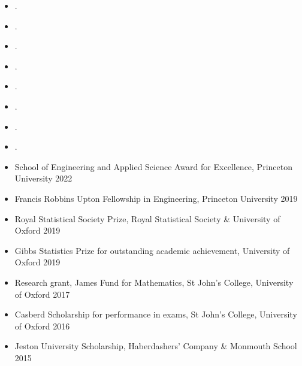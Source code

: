 \documentclass[
  date,
  number,
]{wgu-cv}
\begin{document}
\begin{itemize}
\item {}.
\item {}.
\end{itemize}


\begin{itemize}
\item {}.
\end{itemize}


\begin{itemize}
  \item {}.
  \item {}.
  \item {}.
\end{itemize}


\begin{itemize}
  \item {}.
  \item {}.
\end{itemize}



\begin{itemize}
  \item School of Engineering and Applied Science Award for Excellence,
    Princeton University
    \hfill 2022%
  \item Francis Robbins Upton Fellowship in Engineering,
    Princeton University
    \hfill 2019%
  \item Royal Statistical Society Prize,
    Royal Statistical Society \& University of Oxford
    \hfill 2019%
  \item Gibbs Statistics Prize for outstanding academic achievement,
    University of Oxford
    \hfill 2019%
	\item Research grant, James Fund for Mathematics,
    St John's College, University of Oxford
    \hfill 2017%
	\item Casberd Scholarship for performance in exams,
    St John's College, University of Oxford
    \hfill 2016%
  \item Jeston University Scholarship,
    Haberdashers' Company \& Monmouth School
    \hfill 2015%
\end{itemize}
\end{document}
